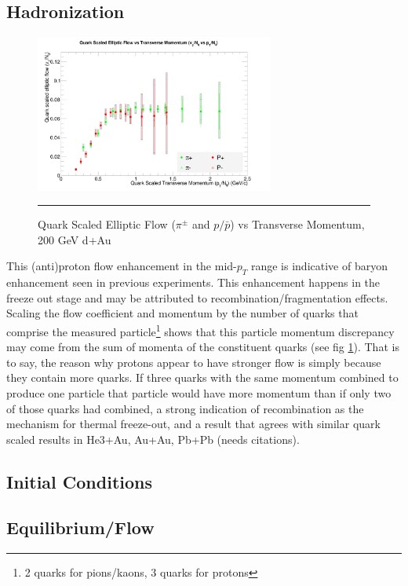 \subsection{Hadronization}
\begin{figure}[hbtp]
\centering    
    \includegraphics[width=0.7\textwidth]{results/v2NqvspT.jpg}
    \rule{35em}{0.5pt}
    \caption[Quark Scaled Elliptic Flow ($\pi^{\pm}$ and $p/\bar{p}$) vs Transverse Momentum, 200 GeV d+Au]{Quark Scaled Elliptic Flow ($\pi^{\pm}$ and $p/\bar{p}$) vs Transverse Momentum, 200 GeV d+Au}
    \label{fig:qscaledv2}
\end{figure}

This (anti)proton flow enhancement in the mid-$p_T$ range is indicative of baryon enhancement seen in previous experiments. This enhancement happens in the freeze out stage and may be attributed to recombination/fragmentation effects. Scaling the flow coefficient and momentum by the number of quarks that comprise the measured particle\footnote{2 quarks for pions/kaons, 3 quarks for protons} shows that this particle momentum discrepancy may come from the sum of momenta of the constituent quarks (see fig \ref{fig:qscaledv2}). That is to say, the reason why protons appear to have stronger flow is simply because they contain more quarks. If three quarks with the same momentum combined to produce one particle that particle would have more momentum than if only two of those quarks had combined, a strong indication of recombination as the mechanism for thermal freeze-out, and a result that agrees with similar quark scaled results in He3+Au, Au+Au, Pb+Pb (needs citations).  
\subsection{Initial Conditions}

\subsection{Equilibrium/Flow}




\pagebreak
\pagebreak


